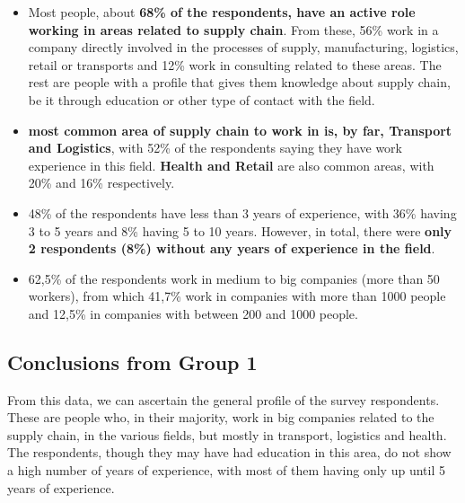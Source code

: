\begin{itemize}
\item Most people, about \textbf{68\% of the respondents, have an active role working in areas related to supply chain}. From these, 56\% work in a company directly involved in the processes of supply, manufacturing, logistics, retail or transports and 12\% work in consulting related to these areas. The rest are people with a profile that gives them knowledge about supply chain, be it through education or other type of contact with the field.
\item \textbf{ most common area of supply chain to work in is, by far, Transport and Logistics}, with 52\% of the respondents saying they have work experience in this field. \textbf{Health and Retail} are also common areas, with 20\% and 16\% respectively.
\item 48\% of the respondents have less than 3 years of experience, with 36\% having 3 to 5 years and 8\% having 5 to 10 years. However, in total, there were \textbf{only 2 respondents (8\%) without any years of experience in the field}.
\item 62,5\% of the respondents work in medium to big companies (more than 50 workers), from which 41,7\% work in companies with more than 1000 people and 12,5\% in companies with between 200 and 1000 people.
\end{itemize}

\subsection*{Conclusions from Group 1}

From this data, we can ascertain the general profile of the survey respondents. These are people who, in their majority, work in big companies related to the supply chain, in the various fields, but mostly in transport, logistics and health. The respondents, though they may have had education in this area, do not show a high number of years of experience, with most of them having only up until 5 years of experience.
